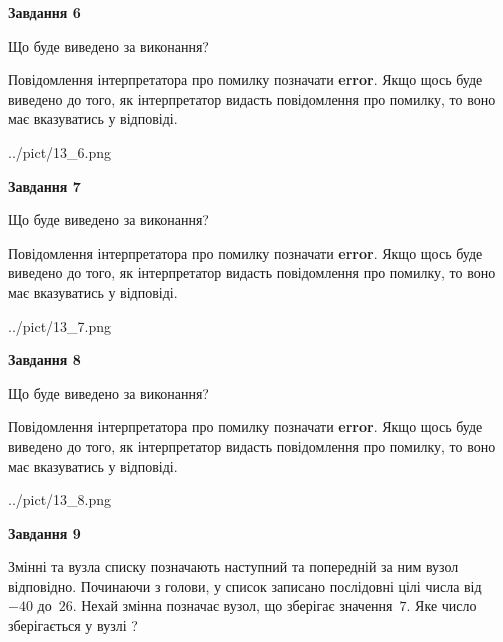 \documentclass[12pt, ukrainian]{article}
\begin{document}
{\begin {large}
{\begin {center}\textbf{Завдання 6}\end {center}}\par
Що буде виведено за виконання?

Повідомлення інтерпретатора про помилку позначати \textbf{error}.
Якщо щось буде виведено до того, як інтерпретатор видасть повідомлення про помилку, 
то воно має вказуватись у відповіді. \par


\begin{center}
	{../pict/13_6.png}
\end{center}
\newpage

{\begin {center}\textbf{Завдання 7}\end {center}}\par
Що буде виведено за виконання?

Повідомлення інтерпретатора про помилку позначати \textbf{error}.
Якщо щось буде виведено до того, як інтерпретатор видасть повідомлення про помилку, 
то воно має вказуватись у відповіді. \par


\begin{center}
	{../pict/13_7.png}
\end{center}
\newpage

{\begin {center}\textbf{Завдання 8}\end {center}}\par
Що буде виведено за виконання?

Повідомлення інтерпретатора про помилку позначати \textbf{error}.
Якщо щось буде виведено до того, як інтерпретатор видасть повідомлення про помилку, 
то воно має вказуватись у відповіді. \par


\begin{center}
	{../pict/13_8.png}
\end{center}
\newpage

{\begin {center}\textbf{Завдання 9}\end {center}}\par
Змінні  та  вузла списку позначають наступний та попередній за ним вузол відповідно. Починаючи з голови, у список записано послідовні цілі числа від~$-40$ до~$26$. Нехай змінна  позначає вузол, що зберігає значення~$7$.
Яке число зберігається у вузлі  ?\par
\newpage


\end{large}}
\end{document}
